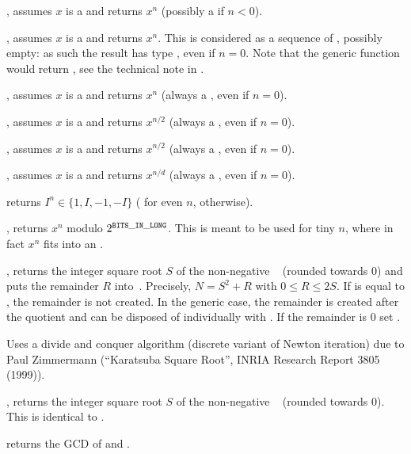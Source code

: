 , assumes $x$ is a  and returns $x^n$
(possibly a  if $n < 0$).

, assumes $x$ is a  and returns
$x^n$. This is considered as a sequence of , possibly empty:
as such the result has type , even if $n = 0$.
Note that the generic function  would return ,
see the technical note in .

, assumes $x$ is a  and returns $x^n$
(always a , even if $n = 0$).

, assumes $x$ is a  and returns
$x^{n/2}$ (always a , even if $n = 0$).

, assumes $x$ is a  and returns
$x^{n/2}$ (always a , even if $n = 0$).

, assumes $x$ is a  and
returns $x^{n/d}$ (always a , even if $n = 0$).

 returns $I^n\in\{1,I,-1,-I\}$ ( for even $n$,
 otherwise).

, returns $x^n$ modulo $2^{\tt BITS\_IN\_LONG}$. This is
meant to be used for tiny $n$, where in fact $x^n$ fits into an .

, returns the integer square root $S$ of
the non-negative ~ (rounded towards 0) and puts the remainder
$R$ into~. Precisely, $N = S^2 + R$ with $0\leq R \leq 2S$. If
 is equal to , the remainder is not created. In the generic
case, the remainder is created after the quotient and can be disposed of
individually with . If the remainder is $0$ set .

Uses a divide and conquer algorithm (discrete variant of Newton iteration)
due to Paul Zimmermann (``Karatsuba Square Root'', INRIA Research Report 3805
(1999)).

, returns the integer square root $S$ of
the non-negative ~ (rounded towards 0). This is identical
to .


 returns the GCD of  and .


